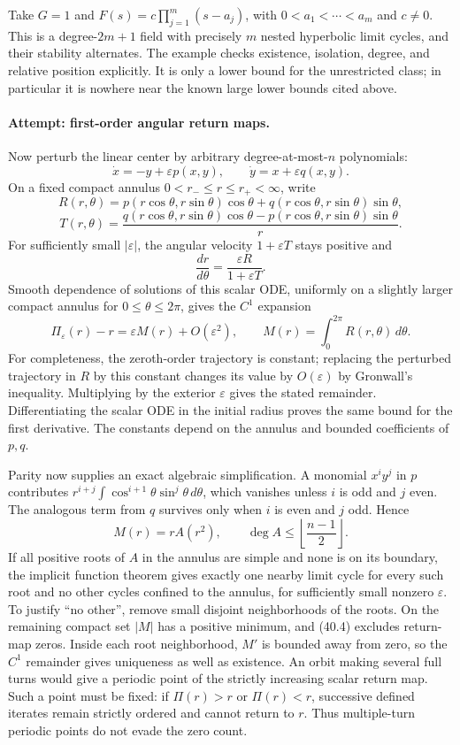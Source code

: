 \documentclass[11pt,a4paper]{article}
\numberwithin{equation}{section}
\begin{document}
Take $G=1$ and
$F(s)=c\prod_{j=1}^{m}(s-a_j)$, with
$0<a_1<\cdots<a_m$ and $c\ne0$. This is a degree-$2m+1$ field
with precisely $m$ nested hyperbolic limit cycles, and their stability
alternates. The example checks existence, isolation, degree, and relative
position explicitly. It is only a lower bound for the unrestricted class;
in particular it is nowhere near the known large lower bounds cited above.

\paragraph{Attempt: first-order angular return maps.}
Now perturb the linear center by arbitrary degree-at-most-$n$ polynomials:
\[
 \dot x=-y+\varepsilon p(x,y),\qquad
 \dot y=x+\varepsilon q(x,y).
\]
On a fixed compact annulus $0<r_-\le r\le r_+<\infty$, write
\[
 R(r,\theta)=p(r\cos\theta,r\sin\theta)\cos\theta+
 q(r\cos\theta,r\sin\theta)\sin\theta,
\]
\[
 T(r,\theta)=\frac{q(r\cos\theta,r\sin\theta)\cos\theta-
 p(r\cos\theta,r\sin\theta)\sin\theta}{r}.
\]
For sufficiently small $|\varepsilon|$, the angular velocity
$1+\varepsilon T$ stays positive and
\[
 \frac{dr}{d\theta}=\frac{\varepsilon R}{1+\varepsilon T}.
\]
Smooth dependence of solutions of this scalar ODE, uniformly on a slightly
larger compact annulus for $0\le\theta\le2\pi$, gives the $C^1$ expansion
\[
 \Pi_\varepsilon(r)-r=\varepsilon M(r)+O(\varepsilon^2),
 \qquad M(r)=\int_0^{2\pi}R(r,\theta)\,d\theta.       \tag{40.4}
\]
For completeness, the zeroth-order trajectory is constant; replacing the
perturbed trajectory in $R$ by this constant changes its value by
$O(\varepsilon)$ by Gronwall's inequality. Multiplying by the exterior
$\varepsilon$ gives the stated remainder. Differentiating the scalar ODE
in the initial radius proves the same bound for the first derivative.
The constants depend on the annulus and bounded coefficients of $p,q$.

Parity now supplies an exact algebraic simplification. A monomial
$x^iy^j$ in $p$ contributes
$r^{i+j}\int\cos^{i+1}\theta\sin^j\theta\,d\theta$, which vanishes
unless $i$ is odd and $j$ even. The analogous term from $q$ survives only
when $i$ is even and $j$ odd. Hence
\[
 M(r)=rA(r^2),\qquad \deg A\le
 \left\lfloor\frac{n-1}{2}\right\rfloor.             \tag{40.5}
\]
If all positive roots of $A$ in the annulus are simple and none is on its
boundary, the implicit function theorem gives exactly one nearby limit
cycle for every such root and no other cycles confined to the annulus,
for sufficiently small nonzero $\varepsilon$. To justify ``no other'',
remove small disjoint neighborhoods of the roots. On the remaining compact
set $|M|$ has a positive minimum, and (40.4) excludes return-map zeros.
Inside each root neighborhood, $M'$ is bounded away from zero, so the
$C^1$ remainder gives uniqueness as well as existence.
An orbit making several full turns would give a periodic point of the
strictly increasing scalar return map. Such a point must be fixed: if
$\Pi(r)>r$ or $\Pi(r)<r$, successive defined iterates remain strictly
ordered and cannot return to $r$. Thus multiple-turn periodic points do
not evade the zero count.
\end{document}
